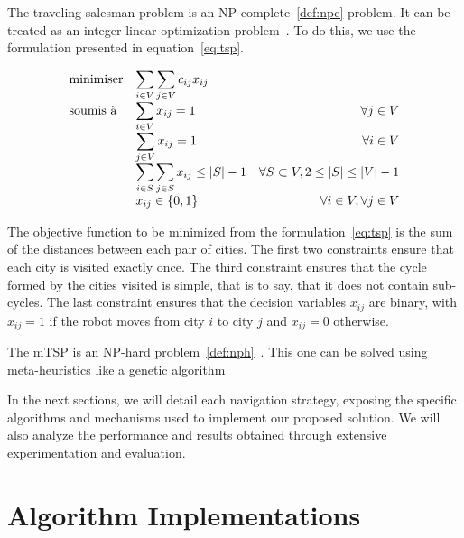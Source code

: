The traveling salesman problem is an NP-complete~\ref{def:npc} problem.
It can be treated as an integer linear optimization problem~\cite{article244, gurobi25}.
To do this, we use the formulation presented in equation~\ref{eq:tsp}.

\begin{equation}
	\label{eq:tsp}
	\begin{array}{ll@{}rr}
		\text{minimiser} &
		\displaystyle\sum\limits_{i \in V} \sum\limits_{j \in V} c_{ij} x_{ij} &
		&
		\\
		\text{soumis à} &
		\displaystyle\sum\limits_{i \in V} x_{ij} = 1 &
		&
		\forall j \in V \\
		&
		\displaystyle\sum\limits_{j \in V} x_{ij} = 1 &
		&
		\forall i \in V \\
		&
		\displaystyle\sum\limits_{i \in S} \sum\limits_{j \in S} x_{ij} \leq |S| - 1 &
		&
		\forall S \subset V, 2 \leq |S| \leq |V| - 1 \\
		&
		x_{ij} \in \{0, 1\} &
		&
		\forall i \in V, \forall j \in V \\
	\end{array}
\end{equation}

The objective function to be minimized from the formulation~\ref{eq:tsp} is the sum of the distances between each pair of cities.
The first two constraints ensure that each city is visited exactly once.
The third constraint ensures that the cycle formed by the cities visited is simple, that is to say, that it does not contain sub-cycles.
The last constraint ensures that the decision variables $x_{ij}$ are binary, with $x_{ij} = 1$ if the robot moves from city $i$ to city $j$ and $x_{ij} = 0$ otherwise.

The mTSP is an NP-hard problem~\ref{def:nph}~\cite{SUNDAR201639}.
This one can be solved using meta-heuristics like a genetic algorithm~\cite{SinghMTSP, Kiraly2011}

In the next sections, we will detail each navigation strategy, exposing the specific algorithms and mechanisms used to implement our proposed solution. We will also analyze the performance and results obtained through extensive experimentation and evaluation.

\section{Algorithm Implementations}

